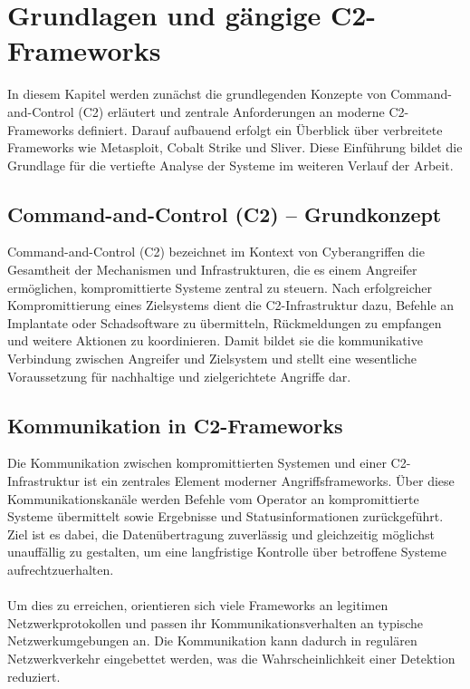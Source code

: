 
\section{Grundlagen und gängige C2-Frameworks}
In diesem Kapitel werden zunächst die grundlegenden Konzepte von Command-and-Control (C2) erläutert und zentrale Anforderungen an moderne C2-Frameworks definiert. 
Darauf aufbauend erfolgt ein Überblick über verbreitete Frameworks wie Metasploit, Cobalt Strike und Sliver. 
Diese Einführung bildet die Grundlage für die vertiefte Analyse der Systeme im weiteren Verlauf der Arbeit.
\subsection{Command-and-Control (C2) – Grundkonzept}
Command-and-Control (C2) bezeichnet im Kontext von Cyberangriffen die Gesamtheit der Mechanismen und Infrastrukturen, die es einem Angreifer ermöglichen, kompromittierte Systeme zentral zu steuern. 
Nach erfolgreicher Kompromittierung eines Zielsystems dient die C2-Infrastruktur dazu, Befehle an Implantate oder Schadsoftware zu übermitteln, Rückmeldungen zu empfangen und weitere Aktionen zu koordinieren. 
Damit bildet sie die kommunikative Verbindung zwischen Angreifer und Zielsystem und stellt eine wesentliche Voraussetzung für nachhaltige und zielgerichtete Angriffe dar. \cite{c2_varonis2026}
\subsection{Kommunikation in C2-Frameworks}
Die Kommunikation zwischen kompromittierten Systemen und einer C2-Infrastruktur ist ein zentrales Element moderner Angriffsframeworks. 
Über diese Kommunikationskanäle werden Befehle vom Operator an kompromittierte Systeme übermittelt sowie Ergebnisse und Statusinformationen zurückgeführt. 
Ziel ist es dabei, die Datenübertragung zuverlässig und gleichzeitig möglichst unauffällig zu gestalten, um eine langfristige Kontrolle über betroffene Systeme aufrechtzuerhalten.
\\\\
Um dies zu erreichen, orientieren sich viele Frameworks an legitimen Netzwerkprotokollen und passen ihr Kommunikationsverhalten an typische Netzwerkumgebungen an. 
Die Kommunikation kann dadurch in regulären Netzwerkverkehr eingebettet werden, was die Wahrscheinlichkeit einer Detektion reduziert.
